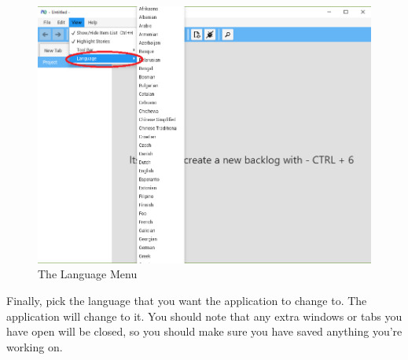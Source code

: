 \begin{figure}[H]
\centering
\includegraphics[width=\textwidth]{images/screenshots/language2.png}
\caption{The Language Menu}
\label{fig:new_project}
\end{figure}\textbf{}

Finally, pick the language that you want the application to change to. The application will change to it. You should note that any extra windows or tabs you have open will be closed, so you should make sure you have saved anything you're working on.